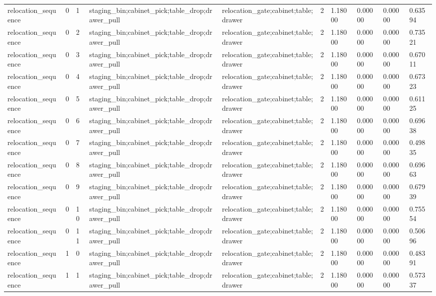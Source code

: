 \documentclass{article}
\begin{document}
\begin{table}[tbp]
{\begin{tabular}{llllllllll}
relocation\_sequence & 0 & 1 & staging\_bin;cabinet\_pick;table\_drop;drawer\_pull & relocation\_gate;cabinet;table;drawer & 2 & 1.18000 & 0.00000 & 0.00000 & 0.63594 \\
relocation\_sequence & 0 & 2 & staging\_bin;cabinet\_pick;table\_drop;drawer\_pull & relocation\_gate;cabinet;table;drawer & 2 & 1.18000 & 0.00000 & 0.00000 & 0.73521 \\
relocation\_sequence & 0 & 3 & staging\_bin;cabinet\_pick;table\_drop;drawer\_pull & relocation\_gate;cabinet;table;drawer & 2 & 1.18000 & 0.00000 & 0.00000 & 0.67011 \\
relocation\_sequence & 0 & 4 & staging\_bin;cabinet\_pick;table\_drop;drawer\_pull & relocation\_gate;cabinet;table;drawer & 2 & 1.18000 & 0.00000 & 0.00000 & 0.67323 \\
relocation\_sequence & 0 & 5 & staging\_bin;cabinet\_pick;table\_drop;drawer\_pull & relocation\_gate;cabinet;table;drawer & 2 & 1.18000 & 0.00000 & 0.00000 & 0.61125 \\
relocation\_sequence & 0 & 6 & staging\_bin;cabinet\_pick;table\_drop;drawer\_pull & relocation\_gate;cabinet;table;drawer & 2 & 1.18000 & 0.00000 & 0.00000 & 0.69638 \\
relocation\_sequence & 0 & 7 & staging\_bin;cabinet\_pick;table\_drop;drawer\_pull & relocation\_gate;cabinet;table;drawer & 2 & 1.18000 & 0.00000 & 0.00000 & 0.49835 \\
relocation\_sequence & 0 & 8 & staging\_bin;cabinet\_pick;table\_drop;drawer\_pull & relocation\_gate;cabinet;table;drawer & 2 & 1.18000 & 0.00000 & 0.00000 & 0.69663 \\
relocation\_sequence & 0 & 9 & staging\_bin;cabinet\_pick;table\_drop;drawer\_pull & relocation\_gate;cabinet;table;drawer & 2 & 1.18000 & 0.00000 & 0.00000 & 0.67939 \\
relocation\_sequence & 0 & 10 & staging\_bin;cabinet\_pick;table\_drop;drawer\_pull & relocation\_gate;cabinet;table;drawer & 2 & 1.18000 & 0.00000 & 0.00000 & 0.75554 \\
relocation\_sequence & 0 & 11 & staging\_bin;cabinet\_pick;table\_drop;drawer\_pull & relocation\_gate;cabinet;table;drawer & 2 & 1.18000 & 0.00000 & 0.00000 & 0.50696 \\
relocation\_sequence & 1 & 0 & staging\_bin;cabinet\_pick;table\_drop;drawer\_pull & relocation\_gate;cabinet;table;drawer & 2 & 1.18000 & 0.00000 & 0.00000 & 0.48391 \\
relocation\_sequence & 1 & 1 & staging\_bin;cabinet\_pick;table\_drop;drawer\_pull & relocation\_gate;cabinet;table;drawer & 2 & 1.18000 & 0.00000 & 0.00000 & 0.57337 \\

\end{tabular}}
\end{table}
\end{document}
